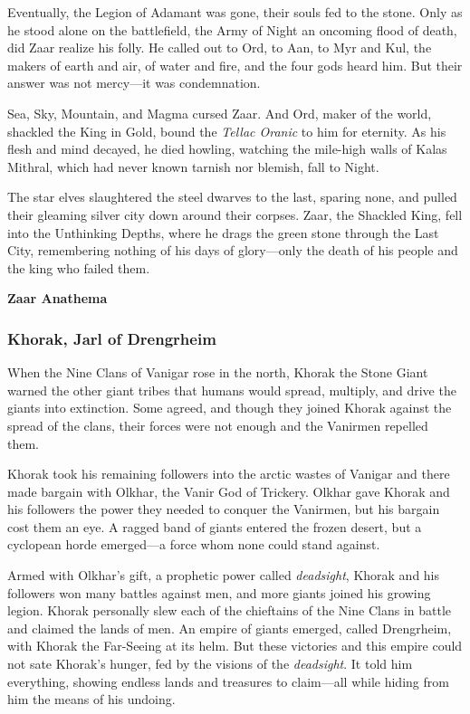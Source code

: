 \documentclass[10pt,a4paper,twoside,bg=print,twocolumn,openany,nodeprecatedcode]{dndbook}
\begin{document}
Eventually, the Legion of Adamant was gone, their souls fed to the stone. Only as he stood alone on the battlefield, the Army of Night an oncoming flood of death, did Zaar realize his folly. He called out to Ord, to Aan, to Myr and Kul, the makers of earth and air, of water and fire, and the four gods heard him. But their answer was not mercy—it was condemnation.

Sea, Sky, Mountain, and Magma cursed Zaar. And Ord, maker of the world, shackled the King in Gold, bound the \textit{Tellac Oranic} to him for eternity. As his flesh and mind decayed, he died howling, watching the mile-high walls of Kalas Mithral, which had never known tarnish nor blemish, fall to Night.

The star elves slaughtered the steel dwarves to the last, sparing none, and pulled their gleaming silver city down around their corpses. Zaar, the Shackled King, fell into the Unthinking Depths, where he drags the green stone through the Last City, remembering nothing of his days of glory—only the death of his people and the king who failed them.

\textbf{Zaar Anathema}

\subsubsection{Khorak, Jarl of Drengrheim}
When the Nine Clans of Vanigar rose in the north, Khorak the Stone Giant warned the other giant tribes that humans would spread, multiply, and drive the giants into extinction. Some agreed, and though they joined Khorak against the spread of the clans, their forces were not enough and the Vanirmen repelled them.

Khorak took his remaining followers into the arctic wastes of Vanigar and there made bargain with Olkhar, the Vanir God of Trickery. Olkhar gave Khorak and his followers the power they needed to conquer the Vanirmen, but his bargain cost them an eye. A ragged band of giants entered the frozen desert, but a cyclopean horde emerged—a force whom none could stand against.

Armed with Olkhar's gift, a prophetic power called \textit{deadsight}, Khorak and his followers won many battles against men, and more giants joined his growing legion. Khorak personally slew each of the chieftains of the Nine Clans in battle and claimed the lands of men. An empire of giants emerged, called Drengrheim, with Khorak the Far-Seeing at its helm. But these victories and this empire could not sate Khorak's hunger, fed by the visions of the \textit{deadsight}. It told him everything, showing endless lands and treasures to claim—all while hiding from him the means of his undoing.
\end{document}
